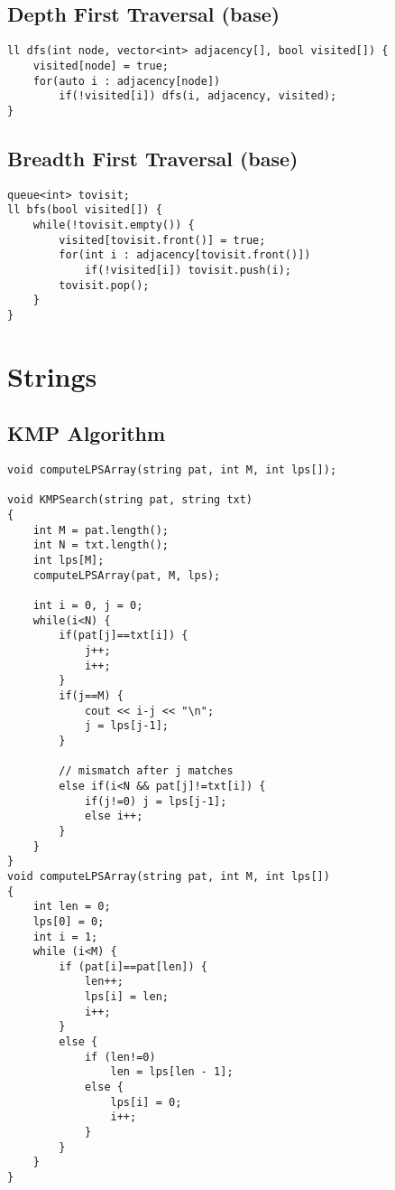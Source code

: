 \documentclass{article}
\begin{document}
        \subsection{Depth First Traversal (base)}


        \begin{lstlisting}
ll dfs(int node, vector<int> adjacency[], bool visited[]) {
    visited[node] = true;
    for(auto i : adjacency[node])
        if(!visited[i]) dfs(i, adjacency, visited);
}       \end{lstlisting}


        \subsection{Breadth First Traversal (base)}


        \begin{lstlisting}
queue<int> tovisit;
ll bfs(bool visited[]) {
    while(!tovisit.empty()) {
        visited[tovisit.front()] = true;
        for(int i : adjacency[tovisit.front()])
            if(!visited[i]) tovisit.push(i);
        tovisit.pop();
    }
}       \end{lstlisting}

    \section{Strings}
        \subsection{KMP Algorithm}
        

        \begin{lstlisting}
void computeLPSArray(string pat, int M, int lps[]);

void KMPSearch(string pat, string txt)
{
    int M = pat.length();
    int N = txt.length();
    int lps[M];
    computeLPSArray(pat, M, lps);
    
    int i = 0, j = 0;
    while(i<N) {
        if(pat[j]==txt[i]) {
            j++;
            i++;
        }
        if(j==M) {
            cout << i-j << "\n";
            j = lps[j-1];
        }
    
        // mismatch after j matches
        else if(i<N && pat[j]!=txt[i]) {
            if(j!=0) j = lps[j-1];
            else i++;
        }
    }
}
void computeLPSArray(string pat, int M, int lps[])
{
    int len = 0;
    lps[0] = 0;
    int i = 1;
    while (i<M) {
        if (pat[i]==pat[len]) {
            len++;
            lps[i] = len;
            i++;
        }
        else {
            if (len!=0)
                len = lps[len - 1];
            else {
                lps[i] = 0;
                i++;
            }
        }
    }
}\end{lstlisting}
\end{document}
